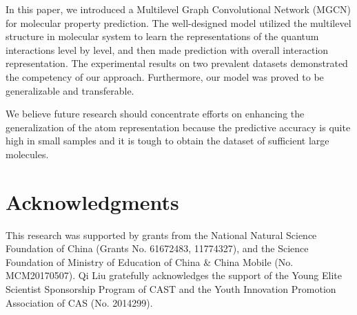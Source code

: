 \documentclass[letterpaper]{article} \usepackage{bm}
\begin{document}
In this paper, we introduced a Multilevel Graph Convolutional Network (MGCN) for molecular property prediction. The well-designed model utilized the multilevel structure in molecular system to learn the representations of the quantum interactions level by level, and then made prediction with overall interaction representation. The experimental results on two prevalent datasets demonstrated the competency of our approach. Furthermore, our model was proved to be generalizable and transferable.  

We believe future research should concentrate efforts on enhancing the generalization of the atom representation because the predictive accuracy is quite high in small samples and it is tough to obtain the dataset of sufficient large molecules. 

\section{ Acknowledgments}
This research was supported by grants from the National Natural Science Foundation of China (Grants No. 61672483, 11774327), and the Science Foundation of Ministry of Education of China \& China Mobile (No. MCM20170507). Qi Liu gratefully acknowledges the support of the Young Elite Scientist Sponsorship Program of CAST and the Youth Innovation Promotion Association of CAS (No. 2014299).



\end{document}
